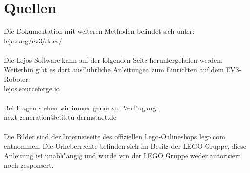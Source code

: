 \section{Quellen}
	Die Dokumentation mit weiteren Methoden befindet sich unter:\\
	lejos.org/ev3/docs/\\ \\
	
	Die Lejos Software kann auf der folgenden Seite heruntergeladen werden. Weiterhin gibt es dort ausf"uhrliche Anleitungen zum Einrichten auf dem EV3-Roboter:\\
	lejos.sourceforge.io\\ \\

	Bei Fragen stehen wir immer gerne zur Verf"ugung:\\
	next-generation@etit.tu-darmstadt.de \\ \\
	
	Die Bilder sind der Internetseite des offiziellen Lego-Onlineshops lego.com entnommen. Die Urheberrechte befinden sich im Besitz der LEGO Gruppe, diese Anleitung ist unabh"angig und wurde von der LEGO Gruppe weder autorisiert noch gesponsert.